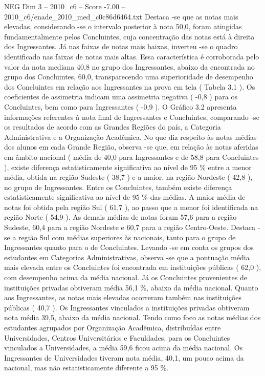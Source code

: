 \begin{textsample}{NEG Dim 3 – 2010\_c6 – Score -7.00 – 2010\_c6/enade\_2010\_med\_c0c86d6464.txt}
Destaca -se que as notas mais elevadas, considerando -se o intervalo posterior à nota 50,0, foram atingidas fundamentalmente pelos Concluintes, cuja concentração das notas está à direita dos Ingressantes.
Já nas faixas de notas mais baixas, inverteu -se o quadro identificado nas faixas de notas mais altas.
Essa característica é corroborada pelo valor da nota mediana 40,8 no grupo dos Ingressantes, abaixo da encontrada no grupo dos Concluintes, 60,0, transparecendo uma superioridade de desempenho dos Concluintes em relação aos Ingressantes na prova em tela ( Tabela 3.1 ).
Os coeficientes de assimetria indicam uma assimetria negativa ( -0,8 ) para os Concluintes, bem como para Ingressantes ( -0,9 ).
O Gráfico 3.2 apresenta informações referentes à nota final de Ingressantes e Concluintes, comparando -se os resultados de acordo com as Grandes Regiões do país, a Categoria Administrativa e a Organização Acadêmica.
No que diz respeito às notas médias dos alunos em cada Grande Região, observa -se que, em relação às notas aferidas em âmbito nacional ( média de 40,0 para Ingressantes e de 58,8 para Concluintes ), existe diferença estatisticamente significativa ao nível de 95 \% entre a menor média, obtida na região Sudeste ( 38,7 ) e a maior, na região Nordeste ( 42,8 ), no grupo de Ingressantes.
Entre os Concluintes, também existe diferença estatisticamente significativa ao nível de 95 \% das médias.
A maior média de notas foi obtida pela região Sul ( 61,7 ), ao passo que a menor foi identificada na região Norte ( 54,9 ).
As demais médias de notas foram 57,6 para a região Sudeste, 60,4 para a região Nordeste e 60,7 para a região Centro-Oeste.
Destaca -se a região Sul com médias superiores às nacionais, tanto para o grupo de Ingressantes quanto para o de Concluintes.
Levando -se em conta os grupos dos estudantes em Categorias Administrativas, observa -se que a pontuação média mais elevada entre os Concluintes foi encontrada em instituições públicas ( 62,0 ), com desempenho acima da média nacional.
Já os Concluintes provenientes de instituições privadas obtiveram média 56,1 \%, abaixo da média nacional.
Quanto aos Ingressantes, as notas mais elevadas ocorreram também nas instituições públicas ( 40,7 ).
Os Ingressantes vinculados a instituições privadas obtiveram nota média 39,5, abaixo da média nacional.
Tendo como foco as notas médias dos estudantes agrupados por Organização Acadêmica, distribuídas entre Universidades, Centros Universitários e Faculdades, para os Concluintes vinculados a Universidades, a média 59,6 ficou acima da média nacional.
Os Ingressantes de Universidades tiveram nota média, 40,1, um pouco acima da nacional, mas não estatisticamente diferente a 95 \%.

\end{textsample}
